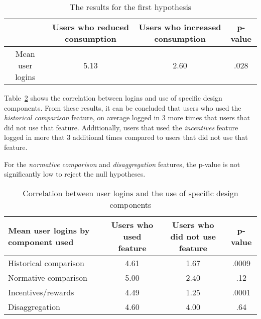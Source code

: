 \documentclass[journal]{vgtc}                %
\begin{document}
\begin{table}
  \caption{The results for the first hypothesis}
  \label{hypo1}
  \scriptsize
  \begin{center}
    \begin{tabular}{cccc}
    \multicolumn{1}{p{1cm}}{\centering } &
       \multicolumn{1}{p{2.5cm}}{\centering Users who reduced consumption} &
       \multicolumn{1}{p{2.5cm}}{\centering Users who increased consumption} &
       \multicolumn{1}{p{1cm}}{\centering p-value} \\
    \hline
      Mean user logins &  5.13 & 2.60 & .028\\

    \end{tabular}
  \end{center}
\end{table}

Table~\ref{hypo2} shows the correlation between logins and use of specific design components. From these results, it can be concluded that users who used the \textit{historical comparison} feature, on average logged in 3 more times that users that did not use that feature. Additionally, users that used the \textit{incentives} feature logged in more that 3 additional times compared to users that did not use that feature.

For the \textit{normative comparison} and \textit{disaggregation} features, the p-value is not significantly low to reject the null hypotheses. \\

\begin{table}
  \caption{Correlation between user logins and the use of specific design components}
  \label{hypo2}
  \scriptsize
  \begin{center}
    \begin{tabular}{lccc}
    \multicolumn{1}{p{2.5cm}}{\centering Mean user logins by component used} &
       \multicolumn{1}{p{2cm}}{\centering Users who used feature} &
       \multicolumn{1}{p{2cm}}{\centering Users who did not use feature} &
       \multicolumn{1}{p{1cm}}{\centering p-value} \\
    \hline
      Historical comparison &  4.61 & 1.67 & .0009\\
      Normative comparison &  5.00 & 2.40 & .12\\
      Incentives/rewards &  4.49 & 1.25 & .0001\\
      Disaggregation &  4.60 & 4.00 & .64\\

    \end{tabular}
  \end{center}
\end{table}
\end{document}
